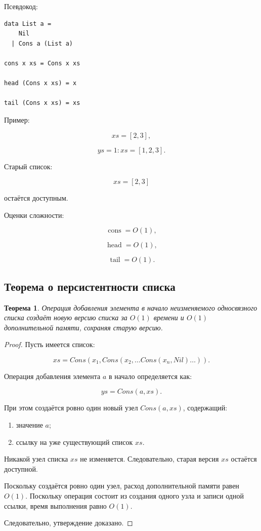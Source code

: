 \documentclass[12pt,a4paper]{article}
\newtheorem{theorem}{Теорема}
\begin{document}
Псевдокод:

\begin{lstlisting}
data List a =
    Nil
  | Cons a (List a)

cons x xs = Cons x xs

head (Cons x xs) = x

tail (Cons x xs) = xs
\end{lstlisting}

Пример:

\[
xs = [2,3],
\]

\[
ys = 1 : xs = [1,2,3].
\]

Старый список:

\[
xs = [2,3]
\]

остаётся доступным.

Оценки сложности:

\[
\operatorname{cons} = O(1),
\]

\[
\operatorname{head} = O(1),
\]

\[
\operatorname{tail} = O(1).
\]

\subsection{Теорема о персистентности списка}

\begin{theorem}
Операция добавления элемента в начало неизменяемого односвязного списка создаёт новую версию списка за $O(1)$ времени и $O(1)$ дополнительной памяти, сохраняя старую версию.
\end{theorem}

\begin{proof}
Пусть имеется список:

\[
xs = Cons(x_1, Cons(x_2, \dots Cons(x_n, Nil)\dots)).
\]

Операция добавления элемента $a$ в начало определяется как:

\[
ys = Cons(a, xs).
\]

При этом создаётся ровно один новый узел $Cons(a, xs)$, содержащий:
\begin{enumerate}
  \item значение $a$;
  \item ссылку на уже существующий список $xs$.
\end{enumerate}

Никакой узел списка $xs$ не изменяется. Следовательно, старая версия $xs$ остаётся доступной.

Поскольку создаётся ровно один узел, расход дополнительной памяти равен $O(1)$. Поскольку операция состоит из создания одного узла и записи одной ссылки, время выполнения равно $O(1)$.

Следовательно, утверждение доказано.
\end{proof}
\end{document}
